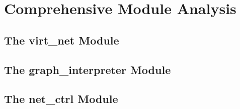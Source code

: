 \chapter{Comprehensive Module Analysis}
    \section{The virt_net Module} \label{sec:virt-net-module}
        
        
        
        
        
        
        
        

    \section{The graph_interpreter Module} \label{sec:graph-interpreter-module}
        

    \section{The net_ctrl Module} \label{sec:net-ctrl-module}
        
